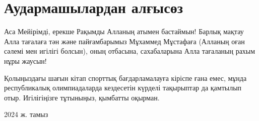 \chapter*{Аудармашылардан алғысөз}

Аса Мейірімді, ерекше Рақымды Алланың атымен бастаймын!
Барлық мақтау Алла тағалаға тән және пайғамбарымыз Мұхаммед Мұстафаға (Алланың оған сәлемі мен игілігі болсын), оның отбасына, сахабаларына Алла тағаланың рахым нұры жаусын!

Қолыңыздағы шағын кітап спорттық бағдарламалауға кіріспе ғана емес, мұнда республикалық олимпиадаларда кездесетін күрделі тақырыптар да қамтылып отыр. 
Игілігіңізге тұтыныңыз, қымбатты оқырман.

\begin{flushright}
2024 ж. тамыз \\
\end{flushright}

